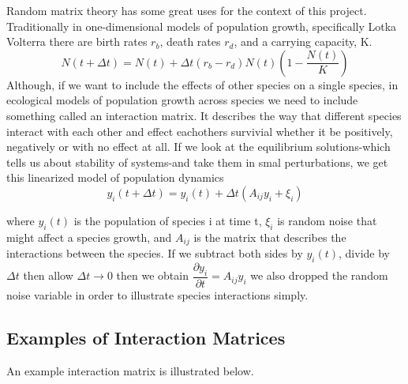 \documentclass{article}
\begin{document}
Random matrix theory has some great uses for the context of this project. Traditionally in one-dimensional models of population growth, specifically Lotka Volterra there are birth rates $r_b$, death rates $r_d$, and a carrying capacity, K.  \hfill\break
\hfill\break 
$$
N(t+\Delta t)=N(t)+\Delta t (r_b-r_d)N(t)(1-\dfrac{N(t)}{K})
$$
\hfill\break \hfill\break
Although, if we want to include the effects of other species on a single species, in ecological models of population growth across species we need to include something called an interaction matrix. It describes the way that different species interact with each other and effect eachothers survivial whether it be positively, negatively or with no effect at all. If we look at the equilibrium solutions-which tells us about stability of systems-and take them in smal perturbations, we get this linearized model of population dynamics \hfill\break
\hfill\break 
\begin{equation}
y_i(t+\Delta t)=y_i(t) + \Delta t(A_{ij}y_i +\xi_i)
\end{equation}

\hfill\break
where $y_i(t)$ is the population of species i at time t, $\xi_i$ is random noise that might affect a species growth, and $A_{ij}$ is the matrix that describes the interactions between the species.
\hfill\break 
If we subtract both sides by $y_i(t)$, divide by $\Delta t$ then allow $\Delta t \rightarrow 0$ then we obtain \hfill\break
$\dfrac{\partial y_i}{\partial t}=A_{ij}y_i$
we also dropped the random noise variable in order to illustrate species interactions simply.
\subsection{Examples of Interaction Matrices}

An example interaction matrix is illustrated below. 
\end{document}
